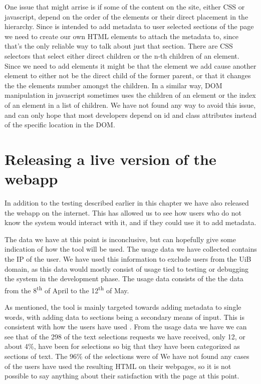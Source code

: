 One issue that might arrise is if some of the content on the site, either CSS or javascript,
depend on the order of the elements or their direct placement in the hierarchy.
Since \theartefact is intended to add metadata to user selected sections of the page we need to create our own
HTML elements to attach the metadata to, since that's the only reliable way to talk about just that section.
There are CSS selectors that select either direct children or the n-th children of an element.
Since we need to add elements it might be that the element we add cause another element to either not be the direct
child of the former parent, or that it changes the the elements number amongst the children.
In a similar way, DOM manipulation in javascript sometimes uses the children of an element or the index of an element
in a list of children.
We have not found any way to avoid this issue,
and can only hope that most developers depend on id and class attributes instead of the specific location in the DOM.

\section{Releasing a live version of the webapp}
In addition to the testing described earlier in this chapter we have also released the webapp on the internet.
This has allowed us to see how users who do not know the system would interact with it,
and if they could use it to add metadata.

The data we have at this point is inconclusive, but can hopefully give some indication of how the tool will be used.
The usage data we have collected contains the IP of the user.
We have used this information to exclude users from the UiB domain,
as this data would mostly consist of usage tied to testing or debugging the system in the development phase.
The usage data consists of the the data from the 8\textsuperscript{th}	 of April to the 12\textsuperscript{th} of May.

As mentioned, the tool is mainly targeted towards adding metadata to single words, with adding data to sections being
a secondary means of input.
This is consistent with how the users have used \theartefact.
From the usage data we have we can see that of the 298 of the text selections requests we have received,
only 12, or about 4\%, have been for selections so big that they have been categorized as sections of text.
The 96\% of the selections were of
We have not found any cases of the users have used the resulting HTML on their webpages,
so it is not possible to say anything about their satisfaction with the page at this point.

